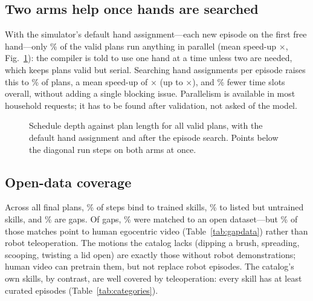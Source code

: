 \documentclass[10pt,twocolumn,letterpaper]{article}
\begin{document}
\subsection{Two arms help once hands are searched}
With the simulator's default hand assignment---each new episode on the first free
hand---only \ParShare\% of the \NScheduled{} valid plans run anything in parallel
(mean speed-up \SpeedMeanDefault$\times$, Fig.~\ref{fig:speedup}): the compiler is
told to use one hand at a time unless two are needed, which keeps plans valid but
serial. Searching hand assignments per episode raises this to \ParShareBal\% of
plans, a mean speed-up of \SpeedMeanBal$\times$ (up to \SpeedMaxBal$\times$), and
\TimeSavedBal\% fewer time slots overall, without adding a single blocking issue.
Parallelism is available in most household requests; it has to be found after
validation, not asked of the model.

\begin{figure}[t]
\centering
{}
\caption{Schedule depth against plan length for all valid plans, with the default
hand assignment and after the episode search. Points below the diagonal run steps
on both arms at once.}
\label{fig:speedup}
\end{figure}

\subsection{Open-data coverage}
Across all final plans, \ShareTrained\% of steps bind to trained skills,
\ShareUntrained\% to listed but untrained skills, and \ShareGap\% are gaps. Of
\GapTotal{} gaps, \GapWithData\% were matched to an open dataset---but
\GapEgoShare\% of those matches point to human egocentric video
(Table~\ref{tab:gapdata}) rather than robot teleoperation. The motions the catalog
lacks (dipping a brush, spreading, scooping, twisting a lid open) are exactly those
without robot demonstrations; human video can pretrain them, but not replace robot
episodes. The catalog's own skills, by contrast, are well covered by teleoperation:
every skill has at least \MinEpisodes{} curated episodes (Table~\ref{tab:categories}).
\end{document}
